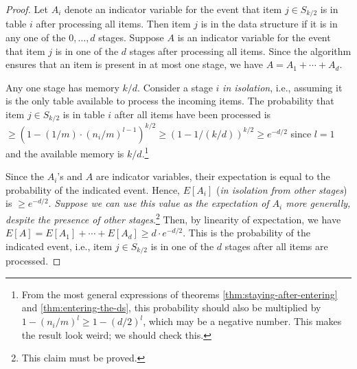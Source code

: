 \documentclass[10pt]{article}
\begin{document}
\begin{proof}
Let $A_i$ denote an indicator variable for the event that item $j \in S_{k/2}$
is in table $i$ after processing all items. Then item $j$ is in the data
structure if it is in any one of the $0, \ldots, d$ stages. Suppose $A$ is an
indicator variable for the event that item $j$ is in one of the $d$ stages after
processing all items. Since the algorithm ensures that an item is present in at
most one stage, we have $A = A_1 + \cdots + A_d$.

Any one stage has memory $k/d$. Consider a stage $i$ {\em in isolation}, i.e.,
assuming it is the only table available to process the incoming items. The
probability that item $j \in S_{k/2}$ is in table $i$ after all items have been
processed is $\geq (1 - (1/m) \cdot (n_i/m)^{l-1})^{k/2} \geq (1 -
1/(k/d))^{k/2} \geq e^{-d/2}$ since $l=1$ and the available memory is
$k/d$.\footnote{From the most general expressions of theorems
  \ref{thm:staying-after-entering} and \ref{thm:entering-the-ds}, this
  probability should also be multiplied by $1 - (n_i/m)^l \geq 1 - (d/2)^l$,
  which may be a negative number. This makes the result look weird; we should
  check this.}

Since the $A_i$'s and $A$ are indicator variables, their expectation is equal to
the probability of the indicated event. Hence, $E[A_i]$ ({\em in isolation from
  other stages}) is $\geq e^{-d/2}$. {\em Suppose we can use this value as the
  expectation of $A_i$ more generally, despite the presence of other
  stages}.\footnote{This claim must be proved.} Then, by linearity of
expectation, we have $E[A] = E[A_1] + \cdots + E[A_d] \geq d \cdot
e^{-d/2}$. This is the probability of the indicated event, i.e., item $j \in
S_{k/2}$ is in one of the $d$ stages after all items are processed.

\end{proof}
\end{document}
